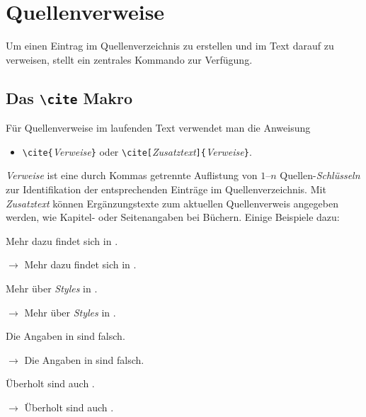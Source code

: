 \section{Quellenverweise}

Um einen Eintrag im Quellenverzeichnis zu erstellen und im Text darauf zu verweisen, stellt \latex ein zentrales Kommando zur Verfügung.

\subsection{Das \texttt{\textbackslash cite} Makro}

Für Quellenverweise im laufenden Text verwendet man die Anweisung
\begin{itemize}
\item[] \verb!\cite{!\textit{Verweise}\verb!}! 
				\quad oder \quad
        \verb!\cite[!\textit{Zusatztext}\verb!]{!\textit{Verweise}\verb!}!.
\end{itemize}

\noindent%
\textit{Verweise} ist eine durch Kommas getrennte Auflistung von $1$--$n$ Quellen-\emph{Schlüsseln}
zur Identifikation der entsprechenden Einträge im Quellenverzeichnis.
Mit \textit{Zusatztext} können Ergänzungstexte zum aktuellen Quellenverweis angegeben
werden, wie \zB Kapitel- oder Seitenangaben bei Büchern.
Einige Beispiele dazu:

\begin{LaTeXCode}[numbers=none]
Mehr dazu findet sich in \cite{Kopka2003}.
\end{LaTeXCode}
$\rightarrow$ Mehr dazu findet sich in \cite{Kopka2003}.

\begin{LaTeXCode}[numbers=none]
Mehr über \emph{Styles} in \cite[Kap.\ 3]{Kopka2003}.
\end{LaTeXCode}
$\rightarrow$ Mehr über \emph{Styles} in \cite[Kap.\ 3]{Kopka2003}.

\begin{LaTeXCode}[numbers=none]
Die Angaben in \cite[S.\ 274--277]{BurgeBurger1999} sind falsch.
\end{LaTeXCode}
$\rightarrow$ Die Angaben in \cite[S.\ 274--277]{BurgeBurger1999} sind falsch.

\begin{LaTeXCode}[numbers=none]
Überholt sind auch \cite{BurgeBurger1999, Patashnik1988, Duden1997}.
\end{LaTeXCode}
$\rightarrow$ Überholt sind auch \cite{BurgeBurger1999, Patashnik1988, Duden1997}.


